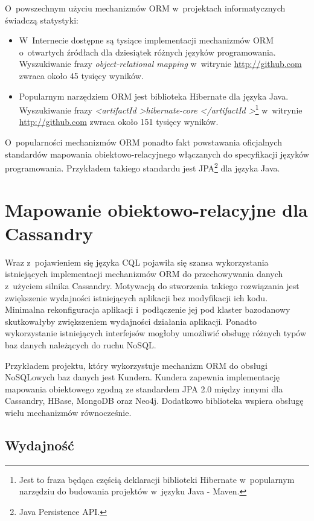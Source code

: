 O~powszechnym użyciu mechanizmów ORM w~projektach informatycznych świadczą statystyki:

\begin{itemize}
	\item W~Internecie dostępne są tysiące implementacji mechanizmów ORM o~otwartych źródłach dla dziesiątek różnych języków programowania. Wyszukiwanie frazy \emph{object-relational mapping} w~witrynie \url{http://github.com} zwraca około 45 tysięcy wyników.
	\item Popularnym narzędziem ORM jest biblioteka Hibernate dla języka Java. Wyszukiwanie frazy \emph{\textless artifactId \textgreater hibernate-core \textless /artifactId \textgreater}\footnote{Jest to fraza będąca częścią deklaracji biblioteki Hibernate w~popularnym narzędziu do budowania projektów w~języku Java - Maven.} w~witrynie \url{http://github.com} zwraca około 151 tysięcy wyników.
\end{itemize}

O~popularności mechanizmów ORM ponadto fakt powstawania oficjalnych standardów mapowania obiektowo-relacyjnego włączanych do specyfikacji języków programowania. Przykładem takiego standardu jest JPA\footnote{Java Persistence API.} dla języka Java.

\section{Mapowanie obiektowo-relacyjne dla Cassandry}

Wraz z~pojawieniem się języka CQL pojawiła się szansa wykorzystania istniejących implementacji mechanizmów ORM do przechowywania danych z~użyciem silnika Cassandry. Motywacją do stworzenia takiego rozwiązania jest zwiększenie wydajności istniejących aplikacji bez modyfikacji ich kodu. Minimalna rekonfiguracja aplikacji i~podłączenie jej pod klaster bazodanowy skutkowałyby zwiększeniem wydajności działania aplikacji. Ponadto wykorzystanie istniejących interfejsów mogłoby umożliwić obsługę różnych typów baz danych należących do ruchu NoSQL. 

Przykładem projektu, który wykorzystuje mechanizm ORM do obsługi NoSQLowych baz danych jest Kundera.\cite{kundera_home} Kundera zapewnia implementację mapowania obiektowego zgodną ze standardem JPA 2.0 między innymi dla Cassandry, HBase, MongoDB oraz Neo4j. Dodatkowo biblioteka wspiera obsługę wielu mechanizmów równocześnie.

\subsection{Wydajność}

